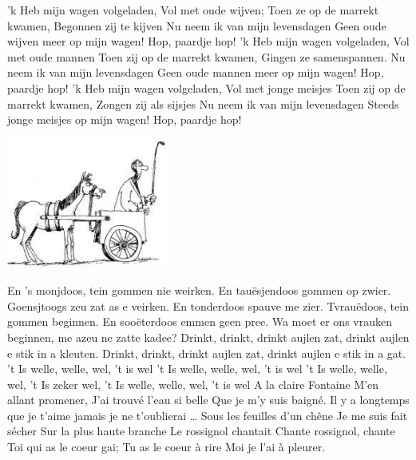 \documentclass{article}
\begin{document}
 
   
\begin{songs}{}
\beginverse*
'k Heb mijn wagen volgeladen,
Vol met oude wijven;
Toen ze op de marrekt kwamen,
Begonnen zij te kijven
Nu neem ik van mijn levensdagen
Geen oude wijven meer op mijn wagen!
Hop, paardje hop!
\endverse
\beginverse*
'k Heb mijn wagen volgeladen,
Vol met oude mannen
Toen zij op de marrekt kwamen,
Gingen ze samenspannen.
Nu neem ik van mijn levensdagen
Geen oude mannen meer op mijn wagen!
Hop, paardje hop!
\endverse
\beginverse*
'k Heb mijn wagen volgeladen,
Vol met jonge meisjes
Toen zij op de marrekt kwamen,
Zongen zij als sijsjes
Nu neem ik van mijn levensdagen
Steeds jonge meisjes op mijn wagen!
Hop, paardje hop!
\endverse
\endsong
\begin{intersong}
    \includegraphics[width=0.4\textwidth]{img1}
\end{intersong}
\beginverse*
En 's monjdoos, tein gommen nie weirken.
En tauësjendoos gommen op zwier.
Goensjtoogs zeu zat as e veirken.
En tonderdoos spauve me zier.
Tvrauëdoos, tein gommen beginnen.
En sooëterdoos emmen geen pree.
Wa moet er ons vrauken beginnen,
me azeu ne zatte kadee?
\endverse
\beginverse*
Drinkt, drinkt, drinkt aujlen zat,
drinkt aujlen e stik in a kleuten.
Drinkt, drinkt, drinkt aujlen zat,
drinkt aujlen e stik in a gat.
\endverse
\endsong
{}
\beginverse*
't Is welle, welle, wel, 't is wel
't Is welle, welle, wel, 't is wel
't Is welle, welle, wel,
't Is zeker wel,
't Is welle, welle, wel, 't is wel
\endverse
\endsong
{}
\beginverse
A la claire Fontaine
M'en allant promener,
J'ai trouvé l'eau si belle
Que je m'y suis baigné.
\endverse
\beginchorus
Il y a longtemps que je t'aime
jamais je ne t'oublierai …
\endchorus
\beginverse
Sous les feuilles d'un chêne
Je me suis fait sécher
Sur la plus haute branche
Le rossignol chantait
\endverse
\beginverse
Chante rossignol, chante
Toi qui as le coeur gai;
Tu as le coeur à rire
Moi je l'ai à pleurer.
\endverse
\beginverse

\end{songs}
\end{document}
